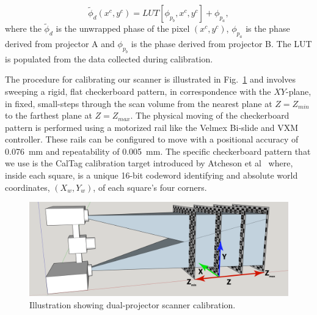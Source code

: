 \documentclass[]{spie}  %
\begin{document}
\begin{equation} \label{eq:1.16}
  	\tilde{\phi}_d(x^c, y^c) = LUT[\phi_{p_b}, x^c, y^c] + \phi_{p_a},
  \end{equation}
where the $\tilde{\phi}_d$ is the unwrapped phase of the pixel $(x^c, y^c)$, $\phi_{p_a}$ is the phase derived from projector A and $\phi_{p_b}$ is the phase derived from projector B.
The LUT is populated from the data collected during calibration.

The procedure for calibrating our scanner is illustrated in Fig.~\ref{Fig:20} and involves sweeping a rigid, flat checkerboard pattern, in correspondence with the $XY$-plane, in fixed, small-steps through the scan volume from the nearest plane at $Z = Z_{min}$ to the farthest plane at $Z = Z_{max}$.  The physical moving of the checkerboard pattern is performed using a motorized rail like the Velmex Bi-slide and VXM controller.  These rails can be configured to move with a positional accuracy of 0.076~mm and repeatability of 0.005~mm.  The specific checkerboard pattern that we use is the CalTag calibration target introduced by Atcheson et al~\cite{??} where, inside each square, is a unique 16-bit codeword identifying and absolute world coordinates,  $(X_w,Y_w)$, of each square's four corners.

\begin{figure}[!t]
\centerline{\includegraphics[width=6.6in]{Figures/SLICalibrationDual}}
\vspace{0.1in}
\caption{Illustration showing dual-projector scanner calibration.}
\label{Fig:20}
\end{figure} 
\end{document}
